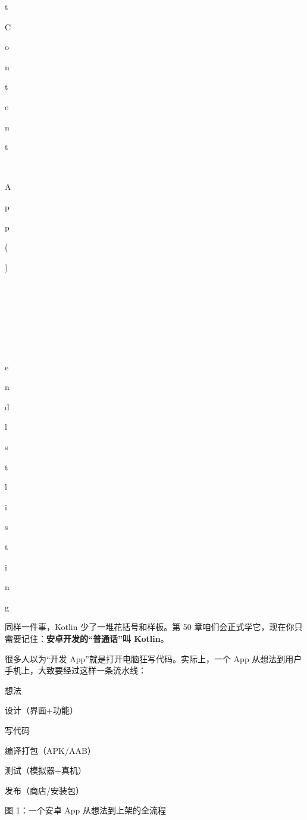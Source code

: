 {{t

C

o

n

t

e

n

t

 

\

{

 

A

p

p

(

)

 

\

}




\

}




\

}




\

e

n

d

{

l

s

t

l

i

s

t

i

n

g

}

同样一件事，Kotlin 少了一堆花括号和样板。第 50 章咱们会正式学它，现在你只需要记住：\textbf{安卓开发的“普通话”叫 Kotlin}。


很多人以为“开发 App”就是打开电脑狂写代码。实际上，一个 App 从想法到用户手机上，大致要经过这样一条流水线：

想法

设计（界面+功能）

写代码

编译打包（APK/AAB）

测试（模拟器+真机）

发布（商店/安装包）

\begin{center}\small\color{gray}图 1：一个安卓 App 从想法到上架的全流程\end{center}

